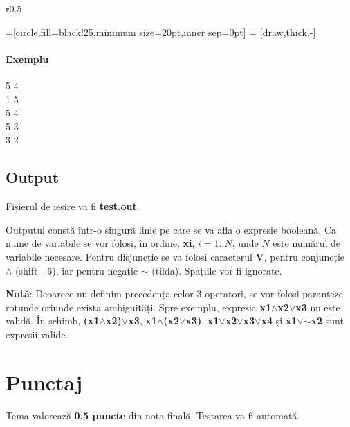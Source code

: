 \documentclass[12pt]{article}
\begin{document}
\begin{wrapfigure}{r}{0.5\textwidth}
  \raggedright
  =[circle,fill=black!25,minimum size=20pt,inner sep=0pt]
   = [draw,thick,-]

\end{wrapfigure}

\paragraph{Exemplu}\mbox{}\par
5 4\\
1 5\\
5 4\\
5 3\\
3 2

\subsection{Output}
Fișierul de ieșire va fi {\bf test.out}.

Outputul constă într-o singură linie pe care se va afla o expresie booleană.
Ca nume de variabile se vor folosi, în ordine, {\bf xi}, $i = 1..N$, unde $N$
este numărul de variabile necesare.
Pentru disjuncție se va folosi caracterul {\bf V}, pentru conjuncție
{\bf $\wedge$} (shift - 6), iar pentru negație {\bf $\sim$} (tilda).
Spațiile vor fi ignorate.

{\bf Notă}: Deoarece nu definim precedența celor 3 operatori,
se vor folosi paranteze rotunde oriunde există ambiguități. Spre exemplu,
expresia {\bf x1$\wedge$x2$\vee$x3} nu este validă. În schimb,
{\bf (x1$\wedge$x2)$\vee$x3}, {\bf x1$\wedge$(x2$\vee$x3)},
{\bf x1$\vee$x2$\vee$x3$\vee$x4} și {\bf x1$\vee$$\sim$x2} sunt expresii valide.

\section{Punctaj}
Tema valorează {\bf 0.5 puncte} din nota finală. Testarea va fi automată.
\end{document}
